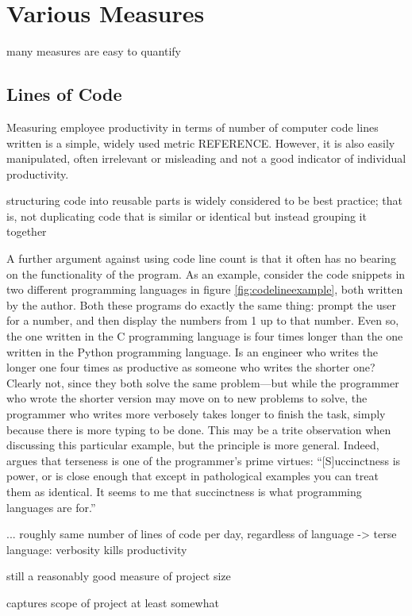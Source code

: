 \documentclass[letterpaper, 12pt]{report}
\begin{document}
\section{Various Measures}
many measures are easy to quantify

\subsection{Lines of Code}
Measuring employee productivity in terms of number of computer code lines written is a simple, widely used metric REFERENCE. 
However, it is also easily manipulated, often irrelevant or misleading and not a good indicator of individual productivity.

structuring code into reusable parts is widely considered to be best practice; that is, not duplicating code that is similar or identical but instead grouping it together

A further argument against using code line count is that it often has no bearing on the functionality of the program. 
As an example, consider the code snippets in two different programming languages in figure \ref{fig:codelineexample}, both written by the author. 
Both these programs do exactly the same thing: prompt the user for a number, and then display the numbers from 1 up to that number. 
Even so, the one written in the C programming language is four times longer than the one written in the Python programming language. 
Is an engineer who writes the longer one four times as productive as someone who writes the shorter one? 
Clearly not, since they both solve the same problem---but while the programmer who wrote the shorter version may move on to new problems to solve, the programmer who writes more verbosely takes longer to finish the task, simply because there is more typing to be done. 
This may be a trite observation when discussing this particular example, but the principle is more general. 
Indeed, \textcite{graham:succinctness} argues that terseness is one of the programmer's prime virtues:
``[S]uccinctness is power, or is close enough that except in pathological examples you can treat them as identical.
It seems to me that succinctness is what programming languages are for.''


... roughly same number of lines of code per day, regardless of language -> terse language: verbosity kills productivity

still a reasonably good measure of project size

captures scope of project at least somewhat
\end{document}
